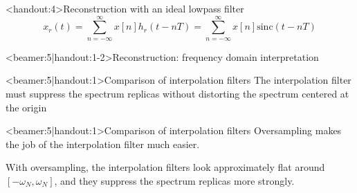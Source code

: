 \documentclass[10pt, handout]{beamer}
\begin{document}
\begin{frame}<handout:4>{Reconstruction with an ideal lowpass filter}
\vspace{-0.5cm}
\begin{equation*}
x_r(t) = \sum_{n=-\infty}^{\infty} x[n]h_r(t-nT) = \sum_{n=-\infty}^{\infty} x[n]\mathrm{sinc}(t-nT)
\end{equation*}
\begin{center}
	\resizebox{0.6\linewidth}{!}{}
\end{center}
\end{frame}

\begin{frame}<beamer:5|handout:1-2>{Reconstruction: frequency domain interpretation}
\begin{center}
\resizebox{0.9\linewidth}{!}{}
\end{center}
\end{frame}

\begin{frame}<beamer:5|handout:1>{Comparison of interpolation filters}
The interpolation filter must suppress the spectrum replicas without distorting the spectrum centered at the origin 
\begin{center}
	\resizebox{\linewidth}{!}{}
\end{center}	
\end{frame}

\begin{frame}<beamer:5|handout:1>{Comparison of interpolation filters}
Oversampling makes the job of the interpolation filter much easier. 
\begin{center}
\resizebox{\linewidth}{!}{}
\end{center}
With oversampling, the interpolation filters look approximately flat around $[-\omega_N, \omega_N]$, and they suppress the spectrum replicas more strongly.
\end{frame}
\end{document}
